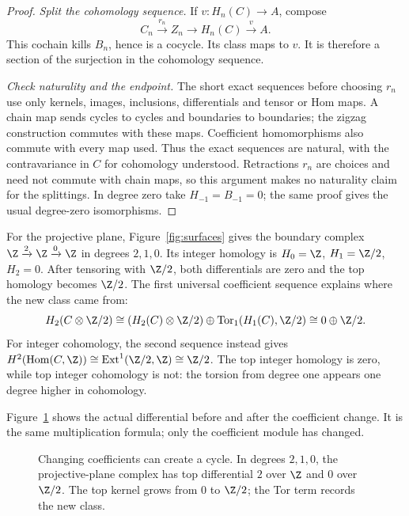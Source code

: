 \begin{proof}
\emph{Split the cohomology sequence.} If $v:H_n(C)\to A$, compose
\[
C_n\xrightarrow{r_n}Z_n\longrightarrow H_n(C)\xrightarrow{v}A.
\]
This cochain kills $B_n$, hence is a cocycle. Its class maps to $v$. It is therefore a section of the surjection in the cohomology sequence.

\emph{Check naturality and the endpoint.} The short exact sequences before choosing $r_n$ use only kernels, images, inclusions, differentials and tensor or Hom maps. A chain map sends cycles to cycles and boundaries to boundaries; the zigzag construction commutes with these maps. Coefficient homomorphisms also commute with every map used. Thus the exact sequences are natural, with the contravariance in $C$ for cohomology understood. Retractions $r_n$ are choices and need not commute with chain maps, so this argument makes no naturality claim for the splittings. In degree zero take $H_{-1}=B_{-1}=0$; the same proof gives the usual degree-zero isomorphisms.
\end{proof}

\begin{example}\label{ex:rp2uct}
For the projective plane, Figure~\ref{fig:surfaces} gives the boundary complex
$\Z\xrightarrow{2}\Z\xrightarrow{0}\Z$ in degrees $2,1,0$. Its integer homology is
$H_0=\Z$, $H_1=\Z/2$, $H_2=0$. After tensoring with $\Z/2$, both differentials are zero and the top homology becomes $\Z/2$.
The first universal coefficient sequence explains where the new class came from:
\[
H_2(C\otimes\Z/2)\cong
(H_2(C)\otimes\Z/2)\oplus\operatorname{Tor}_1(H_1(C),\Z/2)
\cong0\oplus\Z/2.
\]
For integer cohomology, the second sequence instead gives
$H^2(\operatorname{Hom}(C,\Z))\cong\operatorname{Ext}^1(\Z/2,\Z)\cong\Z/2$.
The top integer homology is zero, while top integer cohomology is not: the torsion from degree one appears one degree higher in cohomology.
\end{example}

Figure~\ref{fig:v10new-ch07-coefficients} shows the actual differential before and after the coefficient change. It is the same multiplication formula; only the coefficient module has changed.

\begin{figure}[ht]
\centering
{}
\caption{Changing coefficients can create a cycle. In degrees $2,1,0$, the projective-plane complex has top differential $2$ over $\Z$ and $0$ over $\Z/2$. The top kernel grows from $0$ to $\Z/2$; the Tor term records the new class.}
\label{fig:v10new-ch07-coefficients}
\end{figure}

